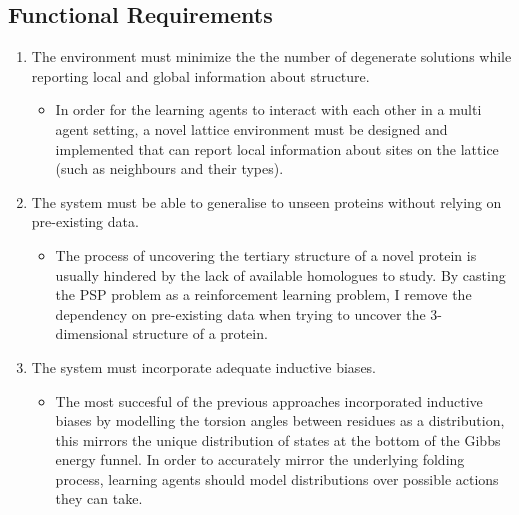 \subsection{Functional Requirements}
\begin{enumerate}
    \item The environment must minimize the the number of degenerate solutions while reporting local and global information about structure.
    \begin{itemize}
        \item In order for the learning agents to interact with each other in a multi agent setting, a
        novel lattice environment must be designed and implemented that can report local information about
        sites on the lattice (such as neighbours and their types).
    \end{itemize}
    \item The system must be able to generalise to unseen proteins without relying on pre-existing data.
    \begin{itemize}
        \item The process of uncovering the tertiary structure of a novel protein is usually hindered
        by the lack of available homologues to study. By casting the PSP problem as a reinforcement learning
        problem, I remove the dependency on pre-existing data when trying to uncover the 3-dimensional structure of a protein.
    \end{itemize}
    \item The system must incorporate adequate inductive biases.
    \begin{itemize}
        \item The most succesful of the previous approaches incorporated inductive biases
        by modelling the torsion angles between residues as a distribution, this mirrors the unique
        distribution of states at the bottom of the Gibbs energy funnel. In order to accurately
        mirror the underlying folding process, learning agents should model distributions over
        possible actions they can take.
    \end{itemize}
\end{enumerate}


